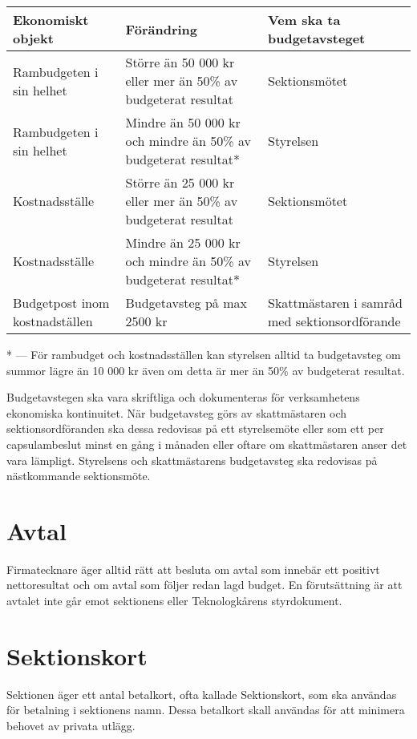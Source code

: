 \documentclass{dsekprotokoll}
\begin{document}
\begin{center}
  \renewcommand{\arraystretch}{1.75}
  \begin{tabular}{p{}|p{}|p{}}
    Ekonomiskt objekt & Förändring & Vem ska ta budgetavsteget \\ \hline
    Rambudgeten i sin helhet & Större än 50 000 kr eller mer än 50\% av
    budgeterat resultat & Sektionsmötet \\
    Rambudgeten i sin helhet & Mindre än 50 000 kr och mindre än 50\% av
    budgeterat resultat* & Styrelsen \\
    Kostnadsställe & Större än 25 000 kr eller mer än 50\% av budgeterat
    resultat & Sektionsmötet \\
    Kostnadsställe & Mindre än 25 000 kr och mindre än 50\% av budgeterat
    resultat* & Styrelsen \\
    Budgetpost inom kostnadställen & Budgetavsteg på max 2500 kr & Skattmästaren
    i samråd med sektionsordförande
  \end{tabular}
  \renewcommand{\arraystretch}{1.0}
\end{center}
* --- För rambudget och kostnadsställen kan styrelsen alltid ta budgetavsteg om summor lägre
än 10 000 kr även om detta är mer än 50\% av budgeterat resultat.

Budgetavstegen ska vara skriftliga och dokumenteras för verksamhetens ekonomiska
kontinuitet. När budgetavsteg görs av skattmästaren och sektionsordföranden ska
dessa redovisas på ett styrelsemöte eller som ett per capsulambeslut minst en
gång i månaden eller oftare om skattmästaren anser det vara lämpligt.
Styrelsens och skattmästarens budgetavsteg ska redovisas på nästkommande
sektionsmöte.

\section{Avtal}
Firmatecknare äger alltid rätt att besluta om avtal som innebär ett positivt nettoresultat och om
avtal som följer redan lagd budget. En förutsättning är att avtalet inte går emot sektionens eller
Teknologkårens styrdokument.

\section{Sektionskort}
Sektionen äger ett antal betalkort, ofta kallade Sektionskort, som ska användas för betalning i
sektionens namn. Dessa betalkort skall användas för att minimera behovet av privata utlägg.
\end{document}
